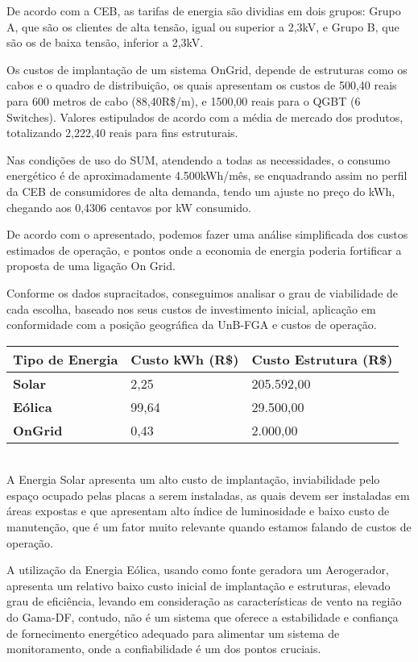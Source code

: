 De acordo com a CEB, as tarifas de energia são dividias em dois grupos: Grupo A, que são os clientes de alta tensão, igual ou superior a 2,3kV, e Grupo B, que são os de baixa tensão, inferior a 2,3kV.

Os custos de implantação de um sistema OnGrid, depende de estruturas como os cabos e o quadro de distribuição, os quais apresentam os custos de 500,40 reais para 600 metros de cabo (88,40R\$/m), e 1500,00 reais para o QGBT (6 Switches). Valores estipulados de acordo com a média de mercado dos produtos, totalizando 2,222,40 reais para fins estruturais.

Nas condições de uso do SUM, atendendo a todas as necessidades, o consumo energético é de aproximadamente 4.500kWh/mês, se enquadrando assim no perfil da CEB de consumidores de alta demanda, tendo um ajuste no preço do kWh, chegando aos 0,4306 centavos por kW consumido\cite{tarifas}.

De acordo com o apresentado, podemos fazer uma análise simplificada dos custos estimados de operação, e pontos onde a economia de energia poderia fortificar a proposta de uma ligação On Grid.

Conforme os dados supracitados, conseguimos analisar o grau de viabilidade de cada escolha, baseado nos seus custos de investimento inicial, aplicação  em conformidade com a posição geográfica da UnB-FGA e custos de operação.
\\

\begin{tabular}{|l|l|l|}
\hline
	\textbf{Tipo de Energia} & \textbf{Custo kWh (R\$)} & \textbf{Custo Estrutura (R\$)}\\
\hline
	\textbf{Solar} & 2,25 & 205.592,00\\
\hline
	\textbf{Eólica} & 99,64 & 29.500,00\\
\hline
	\textbf{OnGrid} & 0,43 & 2.000,00\\
\hline
\end{tabular}\\

A Energia Solar apresenta um alto custo de implantação, inviabilidade  pelo espaço ocupado pelas placas a serem instaladas, as quais devem ser instaladas em áreas expostas e que apresentam alto índice de luminosidade e baixo custo de manutenção, que é um fator muito relevante quando estamos falando de custos de operação.

A utilização da Energia Eólica, usando como fonte geradora um Aerogerador, apresenta um relativo baixo custo inicial de implantação e estruturas, elevado grau de eficiência, levando em consideração as características de vento na região do Gama-DF, contudo, não é um sistema que oferece a estabilidade e confiança de fornecimento energético adequado para alimentar um sistema de monitoramento, onde a confiabilidade é um dos pontos cruciais.

